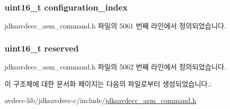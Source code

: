 \subsubsection[{\texorpdfstring{configuration\+\_\+index}{configuration_index}}]{\setlength{\rightskip}{0pt plus 5cm}uint16\+\_\+t configuration\+\_\+index}\hypertarget{structjdksavdecc__aem__command__write__descriptor_afaad1bd7c66f9611e134d8c5ce98f444}{}\label{structjdksavdecc__aem__command__write__descriptor_afaad1bd7c66f9611e134d8c5ce98f444}


jdksavdecc\+\_\+aem\+\_\+command.\+h 파일의 5061 번째 라인에서 정의되었습니다.

\subsubsection[{\texorpdfstring{reserved}{reserved}}]{\setlength{\rightskip}{0pt plus 5cm}uint16\+\_\+t reserved}\hypertarget{structjdksavdecc__aem__command__write__descriptor_a5a6ed8c04a3db86066924b1a1bf4dad3}{}\label{structjdksavdecc__aem__command__write__descriptor_a5a6ed8c04a3db86066924b1a1bf4dad3}


jdksavdecc\+\_\+aem\+\_\+command.\+h 파일의 5062 번째 라인에서 정의되었습니다.



이 구조체에 대한 문서화 페이지는 다음의 파일로부터 생성되었습니다.\+:\begin{DoxyCompactItemize}
\item 
avdecc-\/lib/jdksavdecc-\/c/include/\hyperlink{jdksavdecc__aem__command_8h}{jdksavdecc\+\_\+aem\+\_\+command.\+h}\end{DoxyCompactItemize}
